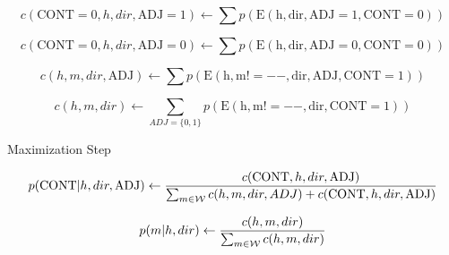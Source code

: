 \documentclass{article}
\begin{document}
 \[c(\mathrm{CONT} = 0, h, dir, \mathrm{ADJ}= 1) \gets 
  \sum p(\mathrm{E(h, dir, ADJ=1, CONT = 0)}) \]

 \[c(\mathrm{CONT} = 0, h, dir, \mathrm{ADJ}= 0) \gets 
  \sum p(\mathrm{E(h, dir, ADJ=0, CONT = 0)}) \]

\[c(h, m, dir, \mathrm{ADJ}) \gets   \sum p(\mathrm{E(h, m!=--, dir, ADJ, CONT = 1)}) \]

\[c(h, m, dir) \gets   \sum\limits_{ADJ=\{0,1\}} p(\mathrm{E(h, m!=--, dir, CONT = 1)}) \]


Maximization Step

  \[p(\mathrm{CONT} | h, dir, \mathrm{ADJ}) \gets 
  \frac{c(\mathrm{CONT}, h, dir, \mathrm{ADJ})}{
    \sum_{m \in {\cal W}} c(h, m, dir, ADJ) + c(\mathrm{CONT}, h, dir, \mathrm{ADJ})} 
  \]



  \[p(m | h, dir) \gets 
  \frac{c(h, m, dir)}{
    \sum_{m \in {\cal W}} c(h, m, dir)}
  \]
\end{document}
